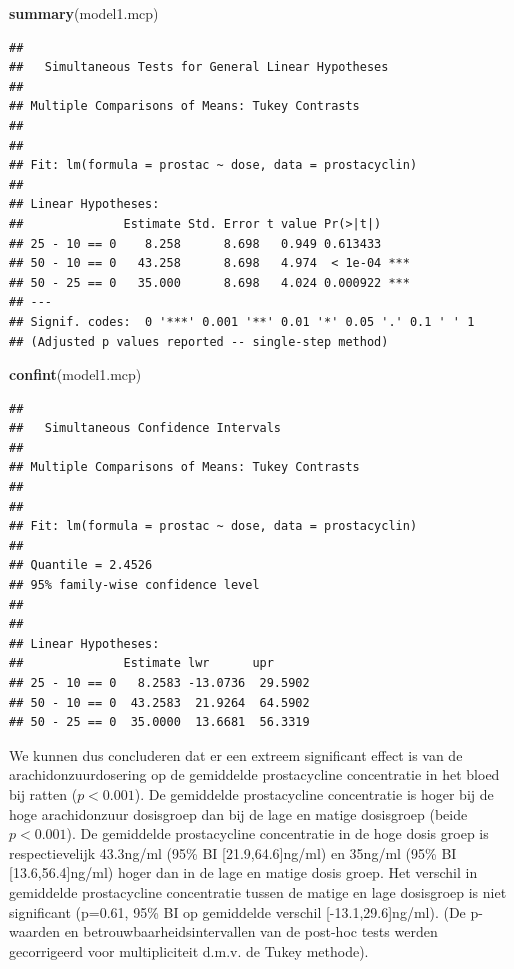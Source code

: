 \documentclass[
  12pt,dutch]{book}
\newenvironment{Shaded}{\begin{snugshade}}{\end{snugshade}}
\newcommand{\FunctionTok}[1]{\textcolor[rgb]{0.13,0.29,0.53}{\textbf{#1}}}
\newcommand{\NormalTok}[1]{#1}
\theoremstyle{definition}
\theoremstyle{definition}
\theoremstyle{definition}
\theoremstyle{definition}
\theoremstyle{remark}
\begin{document}
\begin{Shaded}
\begin{Highlighting}[]
\FunctionTok{summary}\NormalTok{(model1.mcp)}
\end{Highlighting}
\end{Shaded}

\begin{verbatim}
## 
##   Simultaneous Tests for General Linear Hypotheses
## 
## Multiple Comparisons of Means: Tukey Contrasts
## 
## 
## Fit: lm(formula = prostac ~ dose, data = prostacyclin)
## 
## Linear Hypotheses:
##              Estimate Std. Error t value Pr(>|t|)    
## 25 - 10 == 0    8.258      8.698   0.949 0.613433    
## 50 - 10 == 0   43.258      8.698   4.974  < 1e-04 ***
## 50 - 25 == 0   35.000      8.698   4.024 0.000922 ***
## ---
## Signif. codes:  0 '***' 0.001 '**' 0.01 '*' 0.05 '.' 0.1 ' ' 1
## (Adjusted p values reported -- single-step method)
\end{verbatim}

\begin{Shaded}
\begin{Highlighting}[]
\FunctionTok{confint}\NormalTok{(model1.mcp)}
\end{Highlighting}
\end{Shaded}

\begin{verbatim}
## 
##   Simultaneous Confidence Intervals
## 
## Multiple Comparisons of Means: Tukey Contrasts
## 
## 
## Fit: lm(formula = prostac ~ dose, data = prostacyclin)
## 
## Quantile = 2.4526
## 95% family-wise confidence level
##  
## 
## Linear Hypotheses:
##              Estimate lwr      upr     
## 25 - 10 == 0   8.2583 -13.0736  29.5902
## 50 - 10 == 0  43.2583  21.9264  64.5902
## 50 - 25 == 0  35.0000  13.6681  56.3319
\end{verbatim}

We kunnen dus concluderen dat er een extreem significant effect is van de arachidonzuurdosering op de gemiddelde prostacycline concentratie in het bloed bij ratten (\(p<0.001\)).
De gemiddelde prostacycline concentratie is hoger bij de hoge arachidonzuur dosisgroep dan bij de lage en matige dosisgroep (beide \(p<0.001\)).
De gemiddelde prostacycline concentratie in de hoge dosis groep is respectievelijk 43.3ng/ml (95\% BI {[}21.9,64.6{]}ng/ml) en 35ng/ml (95\% BI {[}13.6,56.4{]}ng/ml) hoger dan in de lage en matige dosis groep.
Het verschil in gemiddelde prostacycline concentratie tussen de matige en lage dosisgroep is niet significant (p=0.61, 95\% BI op gemiddelde verschil {[}-13.1,29.6{]}ng/ml).
(De p-waarden en betrouwbaarheidsintervallen van de post-hoc tests werden gecorrigeerd voor multipliciteit d.m.v. de Tukey methode).
\end{document}
